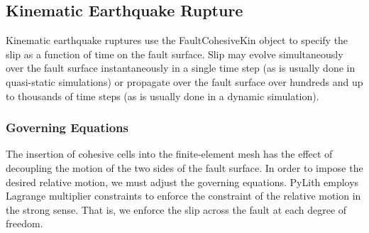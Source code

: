 \subsection{Kinematic Earthquake Rupture}

Kinematic earthquake ruptures use the FaultCohesiveKin object to specify
the slip as a function of time on the fault surface. Slip may evolve
simultaneously over the fault surface instantaneously in a single
time step (as is usually done in quasi-static simulations) or propagate
over the fault surface over hundreds and up to thousands of time steps
(as is usually done in a dynamic simulation).


\subsubsection{Governing Equations}

The insertion of cohesive cells into the finite-element mesh has the
effect of decoupling the motion of the two sides of the fault surface.
In order to impose the desired relative motion, we must adjust the
governing equations. PyLith employs Lagrange multiplier constraints
to enforce the constraint of the relative motion in the strong sense.
That is, we enforce the slip across the fault at each degree of freedom.

